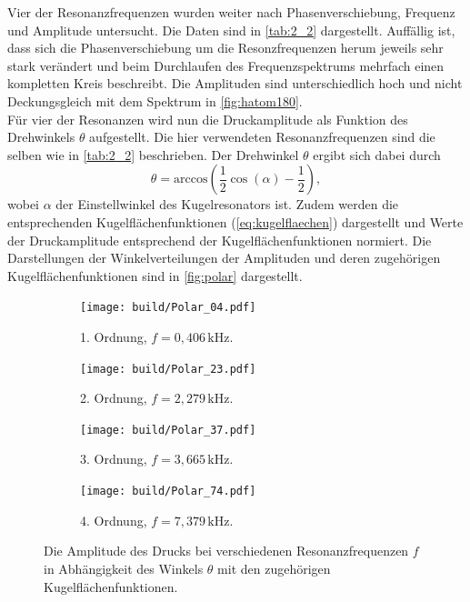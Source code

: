 Vier der Resonanzfrequenzen wurden weiter nach Phasenverschiebung, Frequenz und Amplitude untersucht.
Die Daten sind in \autoref{tab:2_2} dargestellt. Auffällig ist, dass sich die Phasenverschiebung um die Resonzfrequenzen herum jeweils
sehr stark verändert und beim Durchlaufen des Frequenzspektrums mehrfach einen kompletten Kreis beschreibt.
Die Amplituden sind unterschiedlich hoch und nicht Deckungsgleich mit dem Spektrum in \autoref{fig:hatom180}.\\


Für vier der Resonanzen wird nun die Druckamplitude als Funktion des Drehwinkels $\theta$ aufgestellt. Die hier 
verwendeten Resonanzfrequenzen sind die selben wie in \autoref{tab:2_2} beschrieben.
Der Drehwinkel $\theta$ ergibt sich dabei durch 
\begin{equation*}
    \theta = \text{arccos}\left(\frac{1}{2} \cos(\alpha) - \frac{1}{2}\right),
\end{equation*}
wobei $\alpha$ der Einstellwinkel des Kugelresonators ist.
Zudem werden die entsprechenden Kugelflächenfunktionen (\autoref{eq:kugelflaechen}) dargestellt
und Werte der Druckamplitude entsprechend der Kugelflächenfunktionen normiert.
Die Darstellungen der Winkelverteilungen der Amplituden und deren zugehörigen Kugelflächenfunktionen
sind in \autoref{fig:polar} dargestellt.
\begin{figure}
    \centering
    \begin{subfigure}[b]{0.45\textwidth}
        \centering
        \texttt{[image: build/Polar\_04.pdf]}
        \caption{1. Ordnung, $f = 0,406 \, \text{kHz}$.}
    \end{subfigure}
    \hfill
    \begin{subfigure}[b]{0.45\textwidth}
        \centering
        \texttt{[image: build/Polar\_23.pdf]}
        \caption{2. Ordnung, $f = 2,279 \, \text{kHz}$.}
    \end{subfigure}
    \hfill
    \begin{subfigure}[b]{0.45\textwidth}
        \centering
        \texttt{[image: build/Polar\_37.pdf]}
        \caption{3. Ordnung, $f = 3,665 \, \text{kHz}$.}
    \end{subfigure}
    \hfill
    \begin{subfigure}[b]{0.45\textwidth}
        \centering
        \texttt{[image: build/Polar\_74.pdf]}
        \caption{4. Ordnung, $f = 7,379 \, \text{kHz}$.}
    \end{subfigure}
    \hfill
    \caption{Die Amplitude des Drucks bei verschiedenen Resonanzfrequenzen $f$ in Abhängigkeit des Winkels $\theta$ mit den zugehörigen Kugelflächenfunktionen.}
    \label{fig:polar}
\end{figure}

